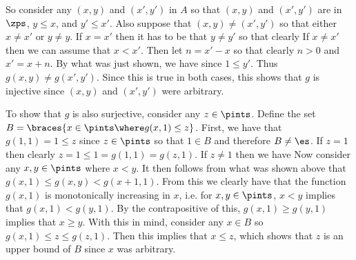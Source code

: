 {{    So consider any $(x,y)$ and $(x',y')$ in $A$ so that $(x,y)$ and $(x',y')$ are in $\zps$, $y \leq x$, and $y' \leq x'$.
    Also suppose that $(x,y) \neq (x',y')$ so that either $x \neq x'$ or $y \neq y$.
    If $x=x'$ then it has to be that $y \neq y'$ so that clearly
    If $x \neq x'$ then we can assume that $x < x'$.
    Then let $n = x'-x$ so that clearly $n > 0$ and $x' = x+n$.
    By what was just shown, we have
    since $1 \leq y'$.
    Thus $g(x,y) \neq g(x',y')$.
    Since this is true in both cases, this shows that $g$ is injective since $(x,y)$ and $(x',y')$ were arbitrary.

    To show that $g$ is also surjective, consider any $z \in \pints$.
    Define the set $B = \braces{x \in \pints \where g(x,1) \leq z}$.
    First, we have that $g(1,1) = 1 \leq z$ since $z \in \pints$ so that $1 \in B$ and therefore $B \neq \es$.
    If $z = 1$ then clearly $z = 1 \leq 1 = g(1,1) = g(z,1)$.
    If $z \neq 1$ then we have
    Now consider any $x,y \in \pints$ where $x < y$.
    It then follows from what was shown above that $g(x,1) \leq g(x,y) < g(x+1,1)$.
    From this we clearly have that the function $g(x,1)$ is monotonically increasing in $x$, i.e. for $x,y \in \pints$, $x < y$ implies that $g(x,1) < g(y,1)$.
    By the contrapositive of this, $g(x,1) \geq g(y,1)$ implies that $x \geq y$.
    With this in mind, consider any $x \in B$ so $g(x,1) \leq z \leq g(z,1)$.
    Then this implies that $x \leq z$, which shows that $z$ is an upper bound of $B$ since $x$ was arbitrary.

}}
